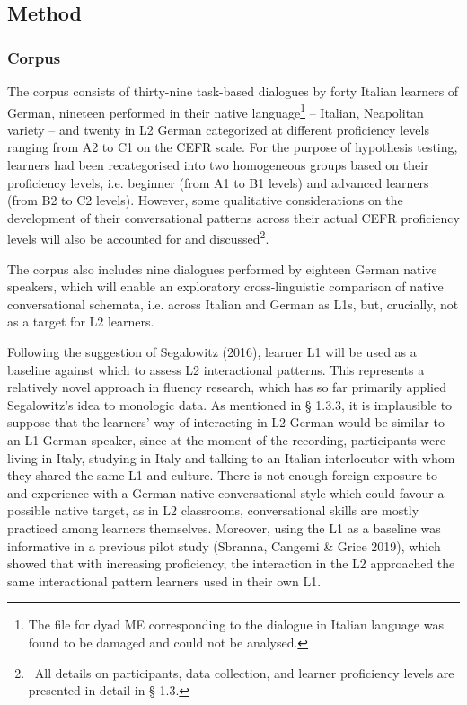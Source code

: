 \subsection[Method]{Method}
\hypertarget{Toc191305929}{}\subsubsection{Corpus}
\hypertarget{Toc191305930}{}\begin{styleStandard}
The corpus consists of thirty-nine task-based dialogues by forty Italian learners of German, nineteen performed in their native language\footnote{The file for dyad ME corresponding to the dialogue in Italian language was found to be damaged and could not be analysed.} – Italian, Neapolitan variety – and twenty in L2 German categorized at different proficiency levels ranging from A2 to C1 on the CEFR scale. For the purpose of hypothesis testing, learners had been recategorised into two homogeneous groups based on their proficiency levels, i.e. beginner (from A1 to B1 levels) and advanced learners (from B2 to C2 levels). However, some qualitative considerations on the development of their conversational patterns across their actual CEFR proficiency levels will also be accounted for and discussed\footnote{\ All details on participants, data collection, and learner proficiency levels are presented in detail in § 1.3.}. 
\end{styleStandard}

\begin{styleStandard}
The corpus also includes nine dialogues performed by eighteen German native speakers, which will enable an exploratory cross-linguistic comparison of native conversational schemata, i.e. across Italian and German as L1s, but, crucially, not as a target for L2 learners. 
\end{styleStandard}

\begin{styleStandard}
Following the suggestion of Segalowitz (2016), learner L1 will be used as a baseline against which to assess L2 interactional patterns. This represents a relatively novel approach in fluency research, which has so far primarily applied Segalowitz’s idea to monologic data. As mentioned in § 1.3.3, it is implausible to suppose that the learners’ way of interacting in L2 German would be similar to an L1 German speaker, since at the moment of the recording, participants were living in Italy, studying in Italy and talking to an Italian interlocutor with whom they shared the same L1 and culture. There is not enough foreign exposure to and experience with a German native conversational style which could favour a possible native target, as in L2 classrooms, conversational skills are mostly practiced among learners themselves. Moreover, using the L1 as a baseline was informative in a previous pilot study (Sbranna, Cangemi \& Grice 2019), which showed that with increasing proficiency, the interaction in the L2 approached the same interactional pattern learners used in their own L1. 
\end{styleStandard}

